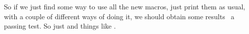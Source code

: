 \documentclass{../skrapport}
\begin{document}
	So if we just find some way to use all the new macros, \eg just print
	them as usual, with a couple of different ways of doing it, we should
	obtain some results \ie\ a passing test. So just \cf \etc and things
	like \viz.
\end{document}
